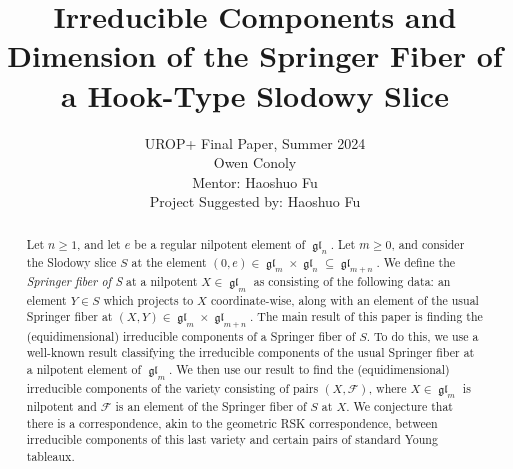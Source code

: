 \documentclass[12pt,psamsfonts]{article}
\author{
UROP+ Final Paper, Summer 2024\\
Owen Conoly\\
Mentor: Haoshuo Fu\\
Project Suggested by: Haoshuo Fu
}
\date{}
\title{Irreducible Components and Dimension of the Springer Fiber of a Hook-Type Slodowy Slice}
\DeclareMathOperator{\gl}{\mathfrak{gl}}
\begin{document}
\maketitle
\begin{abstract}
    Let \(n \geq 1\), and let \(e\) be a regular nilpotent element of \(\gl_n\).
    Let \(m \geq 0\), and consider the Slodowy slice \(S\) at the element \((0, e) \in \gl_m \times \gl_n \subseteq \gl_{m + n}\).
    We define the \emph{Springer fiber of S} at a nilpotent \(X \in \gl_m\) as consisting of the following data: an element \(Y \in S\) which projects to \(X\) coordinate-wise, along with an element of the usual Springer fiber at \((X, Y) \in \gl_m \times \gl_{m + n}\).
    The main result of this paper is finding the (equidimensional) irreducible components of a Springer fiber of \(S\).
    To do this, we use a well-known result classifying the irreducible components of the usual Springer fiber at a nilpotent element of \(\gl_m\).
    We then use our result to find the (equidimensional) irreducible components of the variety consisting of pairs \((X, \mathcal{F})\), where \(X \in \gl_m\) is nilpotent and \(\mathcal{F}\) is an element of the Springer fiber of \(S\) at \(X\).
    We conjecture that there is a correspondence, akin to the geometric RSK correspondence, between irreducible components of this last variety and certain pairs of standard Young tableaux. 
\end{abstract}

\tableofcontents
\end{document}
